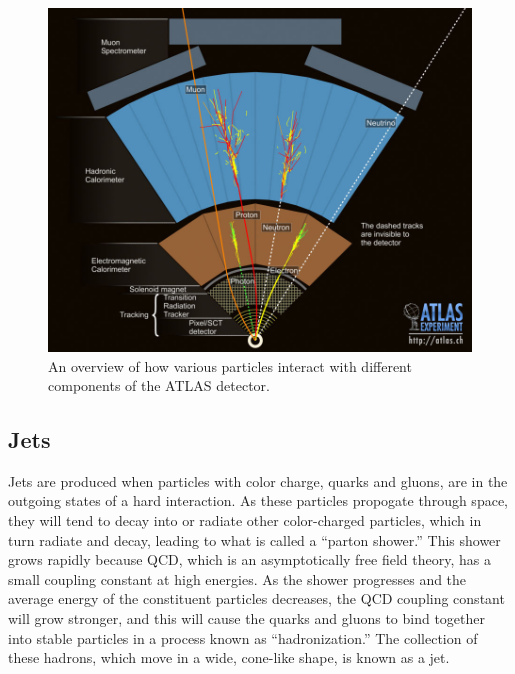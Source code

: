 \begin{figure}
  \begin{center}
    \includegraphics[width=125mm]{figures/atlas/ParticleInteractionOverview.jpg}
  \end{center}
  \caption{An overview of how various particles interact with different components of the ATLAS detector.}
  \label{img:ParticleInteractionOverview}
\end{figure}



\subsection{Jets}
Jets are produced when particles with color charge, quarks and gluons, are in the outgoing states of a hard interaction.
As these particles propogate through space, they will tend to decay into or radiate other color-charged particles, which in turn radiate and decay, leading to what is called a ``parton shower.''
This shower grows rapidly because QCD, which is an asymptotically free field theory, has a small coupling constant at high energies.  
As the shower progresses and the average energy of the constituent particles decreases, the QCD coupling constant will grow stronger, and this will cause the quarks and gluons to bind together into stable particles in a process known as ``hadronization.''
The collection of these hadrons, which move in a wide, cone-like shape, is known as a jet.

